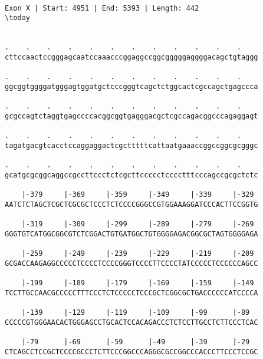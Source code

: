 \documentclass{article}
\begin{document}
 \begin{Verbatim}
 
Exon X | Start: 4951 | End: 5393 | Length: 442
\today


.    .    .    .    .    .    .    .    .    .    .    .    
cttccaactccgggagcaatccaaacccggaggccggcgggggaggggacagctgtaggg
                                                            
.    .    .    .    .    .    .    .    .    .    .    .    
ggcggtggggatgggagtggatgctcccgggtcagctctggcactcgccagctgagccca
                                                            
.    .    .    .    .    .    .    .    .    .    .    .    
gcgccagtctaggtgagccccacggcggtgagggacgctcgccagacggcccagaggagt
                                                            
.    .    .    .    .    .    .    .    .    .    .    .    
tagatgacgtcacctccaggaggactcgctttttcattaatgaaaccggccggcgcgggc
                                                            
.    .    .    .    .    .    .    .    .    .    .    .    
gcatgcgcggcaggccgccttccctctcgcttccccctcccctttcccagccgcgctctc
                                                            
    |-379     |-369     |-359     |-349     |-339     |-329 
AATCTCTAGCTCGCTCGCGCTCCCTCTCCCCGGGCCGTGGAAAGGATCCCACTTCCGGTG
                                                            
    |-319     |-309     |-299     |-289     |-279     |-269 
GGGTGTCATGGCGGCGTCTCGGACTGTGATGGCTGTGGGGAGACGGCGCTAGTGGGGAGA
                                                            
    |-259     |-249     |-239     |-229     |-219     |-209 
GCGACCAAGAGGCCCCCTCCCCTCCCCGGGTCCCCTTCCCCTATCCCCCTCCCCCCAGCC
                                                            
    |-199     |-189     |-179     |-169     |-159     |-149 
TCCTTGCCAACGCCCCCTTTCCCTCTCCCCCTCCCGCTCGGCGCTGACCCCCCATCCCCA
                                                            
    |-139     |-129     |-119     |-109     |-99      |-89  
CCCCCGTGGGAACACTGGGAGCCTGCACTCCACAGACCCTCTCCTTGCCTCTTCCCTCAC
                                                            
    |-79      |-69      |-59      |-49      |-39      |-29  
CTCAGCCTCCGCTCCCCGCCCTCTTCCCGGCCCAGGGCGCCGGCCCACCCTTCCCTCCGC
                                                            

\end{Verbatim}
\end{document}
